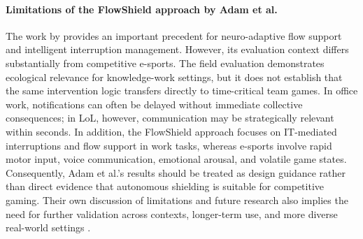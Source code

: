\paragraph{Limitations of the FlowShield approach by Adam et al.}
The work by \textcite{ubt_eref88160} provides an important precedent for neuro-adaptive flow support and intelligent interruption management. However, its evaluation context differs substantially from competitive e-sports. The field evaluation demonstrates ecological relevance for knowledge-work settings, but it does not establish that the same intervention logic transfers directly to time-critical team games. In office work, notifications can often be delayed without immediate collective consequences; in LoL, however, communication may be strategically relevant within seconds. In addition, the FlowShield approach focuses on IT-mediated interruptions and flow support in work tasks, whereas e-sports involve rapid motor input, voice communication, emotional arousal, and volatile game states. Consequently, Adam et al.'s results should be treated as design guidance rather than direct evidence that autonomous shielding is suitable for competitive gaming. Their own discussion of limitations and future research also implies the need for further validation across contexts, longer-term use, and more diverse real-world settings \autocite{ubt_eref88160}.

